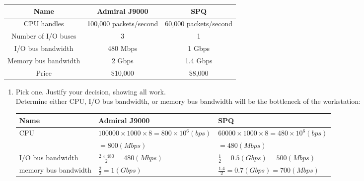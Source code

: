 \documentclass[10pt, a4paper]{article}
\begin{document}
\begin{enumerate}
    \begin{center}
        \begin{tabular}{|c|c|c|}
            \hline
            Name & Admiral J9000 & SPQ\\
            \hline
            CPU handles & 100,000 packets/second & 60,000 packets/second\\
            \hline
            Number of I/O buses & 3 & 1\\
            \hline
            I/O bus bandwidth & 480 Mbps & 1 Gbps\\
            \hline
            Memory bus bandwidth & 2 Gbps & 1.4 Gbps\\
            \hline
            Price & \$10,000 & \$8,000\\
            \hline
        \end{tabular}
    \end{center}
    \begin{enumerate}
    \item Pick one. Justify your decision, showing all work.\\
        \color{blue}
        Determine either CPU, I/O bus bandwidth, or memory bus bandwidth will be the bottleneck of the workstation:
        \begin{tabular}{lll}
            \toprule
            Name & Admiral J9000 & SPQ\\
            \hline
            CPU & $100000 \times 1000 \times 8 = 800 \times 10^6 (bps)$ & $60000 \times 1000 \times 8 = 480 \times 10^6 (bps)$\\
                & $= 800 (Mbps)$ & $= 480 (Mbps)$\\
            I/O bus bandwidth & $\frac{2 \times 480}{2} = 480 (Mbps)$ & $\frac{1}{2} = 0.5 (Gbps) = 500 (Mbps)$\\
            memory bus bandwidth & $\frac{2}{2} = 1 (Gbps)$ & $\frac{1.4}{2} = 0.7 (Gbps) = 700 (Mbps)$\\
            \bottomrule
        \end{tabular}\\


\end{enumerate}
\end{enumerate}
\end{document}
